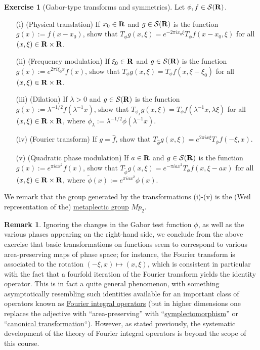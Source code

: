 \documentclass[11pt]{article}
\theoremstyle{definition}
\newtheorem{exercise}[theorem]{Exercise}
\newtheorem{remark}[theorem]{Remark}
\begin{document}
\begin{exercise}[Gabor-type transforms and symmetries]
  Let \({\phi, f \in {\mathcal S}({\bf R})}\). 
\begin{itemize}

\item[(i)] (Physical translation) If \({x_0 \in {\bf R}}\) and \({g \in {\mathcal S}({\bf R})}\) is the function \({g(x) := f(x-x_0)}\), show that \({T_\phi g(x,\xi) = e^{-2\pi i x_0 \xi} T_\phi f(x-x_0,\xi)}\) for all \({(x,\xi) \in {\bf R} \times {\bf R}}\). 
\item[(ii)] (Frequency modulation) If \({\xi_0 \in {\bf R}}\) and \({g \in {\mathcal S}({\bf R})}\) is the function \({g(x) := e^{2\pi i \xi_0 x} f(x)}\), show that \({T_\phi g(x,\xi) = T_\phi f(x,\xi-\xi_0)}\) for all \({(x,\xi) \in {\bf R} \times {\bf R}}\). 
\item[(iii)] (Dilation) If \({\lambda>0}\) and \({g \in {\mathcal S}({\bf R})}\) is the function \({g(x) := \lambda^{-1/2} f(\lambda^{-1} x)}\), show that \({T_{\phi_\lambda}g(x,\xi) = T_\phi f(\lambda^{-1} x, \lambda \xi)}\) for all \({(x,\xi) \in {\bf R} \times {\bf R}}\), where \({\phi_\lambda := \lambda^{-1/2} \phi(\lambda^{-1} x)}\). 
\item[(iv)] (Fourier transform) If \({g = \hat f}\), show that \({T_{\hat \phi} g(x,\xi) = e^{2\pi i x \xi} T_\phi f(-\xi, x)}\). 
\item[(v)] (Quadratic phase modulation) If \({a \in {\bf R}}\) and \({g \in {\mathcal S}({\bf R})}\) is the function \({g(x) := e^{\pi i a x^2} f(x)}\), show that \({T_{\tilde \phi} g(x,\xi) = e^{-\pi i ax^2} T_\phi f(x, \xi-ax)}\) for all \({(x,\xi) \in {\bf R} \times {\bf R}}\), where \({\tilde \phi(x) := e^{\pi i ax^2} \phi(x)}\).


\end{itemize}
 We remark that the group generated by the transformations (i)-(v) is the (Weil representation of the) \href{https://en.wikipedia.org/wiki/Metaplectic_group}{metaplectic group} \({Mp_2}\). 
\end{exercise}
\begin{remark}
  Ignoring the changes in the Gabor test function \({\phi}\), as well as the various phases appearing on the right-hand side, we conclude from the above exercise that basic transformations on functions seem to correspond to various area-preserving maps of phase space; for instance, the Fourier transform is associated to the rotation \({(-\xi,x) \mapsto (x,\xi)}\), which is consistent in particular with the fact that a fourfold iteration of the Fourier transform yields the identity operator. This is in fact a quite general phenomenon, with something asymptotically resembling such identities available for an important class of operators known as \href{https://en.wikipedia.org/wiki/Fourier_integral_operator}{Fourier integral operators} (but in higher dimensions one replaces the adjective with “area-preserving” with “\href{https://en.wikipedia.org/wiki/Symplectomorphism}{symplectomorphism}” or “\href{https://en.wikipedia.org/wiki/Canonical_transformation}{canonical transformation}“). However, as stated previously, the systematic development of the theory of Fourier integral operators is beyond the scope of this course. 
\end{remark}
\end{document}
